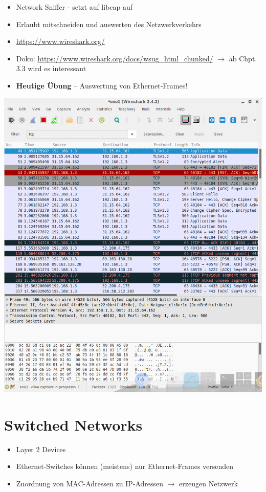 \documentclass[xcolor=dvipsnames]{beamer}
\begin{document}
\begin{frame}
\hspace{-1.3cm}
\begin{minipage}{0.6\textwidth}
\begin{itemize}
	\item Network Sniffer - setzt auf libcap auf
	\item Erlaubt mitschneiden und auswerten des Netzwerkverkehrs
	\item \url{https://www.wireshark.org/}
	\item Doku: \url{https://www.wireshark.org/docs/wsug_html_chunked/} $\rightarrow$ ab Chpt. 3.3 wird es interessant
	\item \textbf{Heutige Übung} -- Auswertung von Ethernet-Frames!
\end{itemize}
\end{minipage}%
\begin{minipage}{0.4\textwidth}
\includegraphics[scale=0.2]{wireshark}
\end{minipage}
\end{frame}

\section{Switched Networks}
\begin{frame}
	\begin{itemize}
		\item Layer 2 Devices
		\item Ethernet-Switches können (meistens) nur Ethernet-Frames versenden
		\item Zuordnung von MAC-Adressen zu IP-Adressen $\rightarrow$ erzeugen Netzwerk
	\end{itemize}
\end{frame}
\end{document}
